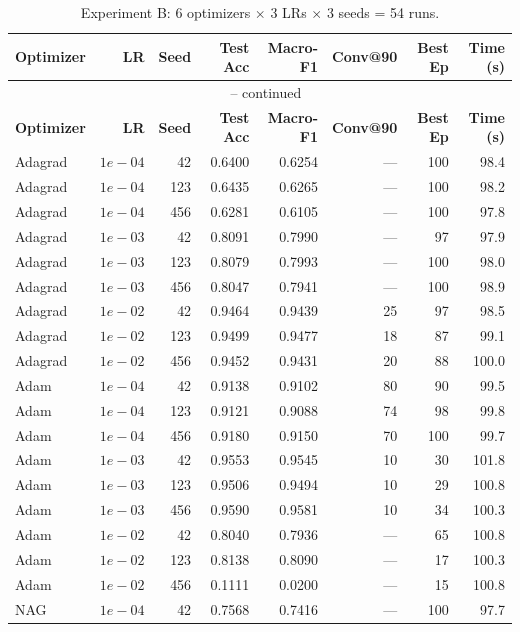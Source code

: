 \documentclass[10pt,letterpaper]{article}
\begin{document}
\begin{longtable}{lrrrrrrr}
\caption{Experiment B: 6 optimizers $\times$ 3 LRs $\times$ 3 seeds = 54 runs.}\label{tab:appC-expB}\\
\toprule
\textbf{Optimizer} & \textbf{LR} & \textbf{Seed} & \textbf{Test Acc} & \textbf{Macro-F1} & \textbf{Conv@90} & \textbf{Best Ep} & \textbf{Time (s)} \\
\midrule
\endfirsthead
\multicolumn{8}{c}{\tablename\ \thetable{} -- continued}\\
\toprule
\textbf{Optimizer} & \textbf{LR} & \textbf{Seed} & \textbf{Test Acc} & \textbf{Macro-F1} & \textbf{Conv@90} & \textbf{Best Ep} & \textbf{Time (s)} \\
\midrule
\endhead
\bottomrule
\endfoot
Adagrad & $1e-04$ & 42 & 0.6400 & 0.6254 & --- & 100 & 98.4 \\
Adagrad & $1e-04$ & 123 & 0.6435 & 0.6265 & --- & 100 & 98.2 \\
Adagrad & $1e-04$ & 456 & 0.6281 & 0.6105 & --- & 100 & 97.8 \\
Adagrad & $1e-03$ & 42 & 0.8091 & 0.7990 & --- & 97 & 97.9 \\
Adagrad & $1e-03$ & 123 & 0.8079 & 0.7993 & --- & 100 & 98.0 \\
Adagrad & $1e-03$ & 456 & 0.8047 & 0.7941 & --- & 100 & 98.9 \\
Adagrad & $1e-02$ & 42 & 0.9464 & 0.9439 & 25 & 97 & 98.5 \\
Adagrad & $1e-02$ & 123 & 0.9499 & 0.9477 & 18 & 87 & 99.1 \\
Adagrad & $1e-02$ & 456 & 0.9452 & 0.9431 & 20 & 88 & 100.0 \\
Adam & $1e-04$ & 42 & 0.9138 & 0.9102 & 80 & 90 & 99.5 \\
Adam & $1e-04$ & 123 & 0.9121 & 0.9088 & 74 & 98 & 99.8 \\
Adam & $1e-04$ & 456 & 0.9180 & 0.9150 & 70 & 100 & 99.7 \\
Adam & $1e-03$ & 42 & 0.9553 & 0.9545 & 10 & 30 & 101.8 \\
Adam & $1e-03$ & 123 & 0.9506 & 0.9494 & 10 & 29 & 100.8 \\
Adam & $1e-03$ & 456 & 0.9590 & 0.9581 & 10 & 34 & 100.3 \\
Adam & $1e-02$ & 42 & 0.8040 & 0.7936 & --- & 65 & 100.8 \\
Adam & $1e-02$ & 123 & 0.8138 & 0.8090 & --- & 17 & 100.3 \\
Adam & $1e-02$ & 456 & 0.1111 & 0.0200 & --- & 15 & 100.8 \\
NAG & $1e-04$ & 42 & 0.7568 & 0.7416 & --- & 100 & 97.7 \\

\end{longtable}
\end{document}

